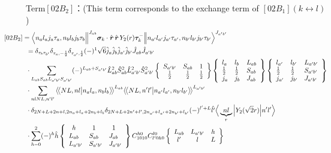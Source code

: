 \documentclass[master]{shnuthesis}
\newcommand{\llangle}{\big\langle\!\big\langle}
\newcommand{\rrangle}{\big\rangle\!\big\rangle}
\newcommand{\bmr}{\textbf{\textit{r}}}
\newcommand{\ap}{a^\prime}
\newcommand{\bp}{b^\prime}
\newcommand{\ii}{\!\!\!\!\!\!\!\!\!\!\!\!\!\!\!\!\!\!\!\!}
\begin{document}
{\color{red}Term$[02B_2]$：}(This term corresponds to the exchange term of $[02B_1]$$(k \longleftrightarrow l)$)
\begin{align}
    &\ii [02B_2] = \Big\langle n_a l_a j_a \tau_a, n_b l_b j_b \tau_b \Big\|^{J_{ab}} \bm{\sigma}_k\cdot\hat{\bmr}\,\hat{\bmr}\, Y_2(r) \bm{\tau}_k^- \Big\| n_{\ap} l_{\ap} j_{\ap} \tau_{\ap}, n_{\bp} l_{\bp} j_{\bp} \tau_{\bp} \Big\rangle^{J_{\ap \bp}} \\
    & = \delta_{\tau_b \tau_{\bp}}\delta_{\tau_a, -\frac{1}{2}}\delta_{\tau_{\ap}, \frac{1}{2}} (-)^{1} \sqrt{6}\hat{j}_a\hat{j}_b\hat{j}_{\ap}\hat{j}_{\bp} \hat{J}_{ab}\hat{J}_{\ap\bp}  \notag \\
    & \cdot \sum_{L_{ab}S_{ab}L_{\ap\bp}S_{\ap\bp}} (-)^{L_{ab}+S_{\ap\bp}} \hat{L}_{ab}^2\hat{S}_{ab}^2\hat{L}_{\ap\bp}^2\hat{S}_{\ap\bp}^2  \left\{\begin{array}{ccc} S_{\ap\bp} & S_{ab} & 1 \\ \frac{1}{2} & \frac{1}{2} & \frac{1}{2} \end{array}\right\}  \left\{\begin{array}{lll}l_{a} & l_{b} & L_{ab} \\ \frac{1}{2} & \frac{1}{2} & S_{ab} \\j_{a} & j_{b} & J_{ab} \end{array}\right\} \left\{\begin{array}{lll}l_{\ap} & l_{\bp} & L_{\ap\bp} \\ \frac{1}{2} & \frac{1}{2} & S_{\ap\bp} \\j_{\ap} & j_{\bp} & J_{\ap\bp} \end{array}\right\}  \notag\\
    & \cdot \sum_{nlNL,n^\prime l^\prime} \llangle N L, n l \big| n_{a} l_{a}, n_{b} l_{b} \rrangle^{L_{ab}} \llangle N L, n^\prime l^\prime \big| n_{a^\prime} l_{a^\prime}, n_{b^\prime} l_{b^\prime} \rrangle^{L_{\ap\bp}} \notag\\
    & \cdot \delta_{2N+L+2n+l,2n_a+l_a+2n_b+l_b}\delta_{2N+L+2n^\prime+l^\prime,2n_{a^\prime}+l_{a^\prime}+2n_{b^\prime}+l_{b^\prime}} (-)^{l^\prime+L}\hat{l^\prime} \Big\langle \underbrace{n l}_{r} \Big| Y_2(\sqrt{2}r) \Big| n^\prime l^\prime \Big\rangle  \notag\\
    & \cdot \sum_{h=0}^{2} (-)^{h}\hat{h} \left\{\begin{array}{lll} \,\,\,h & \,\,\,1 & \,\,\,1 \\ L_{ab} & S_{ab} & J_{ab} \\ L_{\ap\bp} & S_{\ap\bp} & J_{\ap\bp} \end{array}\right\}  C_{1010}^{h0}C_{l^\prime 0 h 0}^{l0}  \left\{\begin{array}{ccc} L_{ab} & L_{\ap\bp} & h \\ l^\prime & l & L \end{array}\right\}

\end{align}$$
\end{document}
